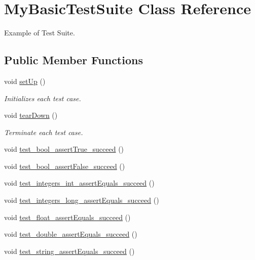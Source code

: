 \hypertarget{class_my_basic_test_suite}{}\section{My\+Basic\+Test\+Suite Class Reference}
\label{class_my_basic_test_suite}


Example of Test Suite.  


\subsection*{Public Member Functions}
\begin{DoxyCompactItemize}
\item 
void \mbox{\hyperlink{class_my_basic_test_suite_a78580af3199c6d14278446ba5c67b741}{set\+Up}} ()
\begin{DoxyCompactList}\small\item\em Initializes each test case. \end{DoxyCompactList}\item 
void \mbox{\hyperlink{class_my_basic_test_suite_a83b6bce47ffac97d43b8e2d14cbd48aa}{tear\+Down}} ()
\begin{DoxyCompactList}\small\item\em Terminate each test case. \end{DoxyCompactList}\item 
void \mbox{\hyperlink{class_my_basic_test_suite_a0f9bf87994d157ca17f8cf2d8d8d31b7}{test\+\_\+bool\+\_\+assert\+True\+\_\+succeed}} ()
\item 
void \mbox{\hyperlink{class_my_basic_test_suite_ae8f4c3d56e31655ae5f887c4f73b34e6}{test\+\_\+bool\+\_\+assert\+False\+\_\+succeed}} ()
\item 
void \mbox{\hyperlink{class_my_basic_test_suite_a78e65fb1514fc53943a942d99222ef26}{test\+\_\+integers\+\_\+int\+\_\+assert\+Equals\+\_\+succeed}} ()
\item 
void \mbox{\hyperlink{class_my_basic_test_suite_af6dbaa47377dfe79f4c00a20789757ed}{test\+\_\+integers\+\_\+long\+\_\+assert\+Equals\+\_\+succeed}} ()
\item 
void \mbox{\hyperlink{class_my_basic_test_suite_ab56d6a5bc0e0ccb511798df750acb4a1}{test\+\_\+float\+\_\+assert\+Equals\+\_\+succeed}} ()
\item 
void \mbox{\hyperlink{class_my_basic_test_suite_a4e1eb8aaa161bb78d81f87ced7a34622}{test\+\_\+double\+\_\+assert\+Equals\+\_\+succeed}} ()
\item 
void \mbox{\hyperlink{class_my_basic_test_suite_ac6cfe0dda4c123f996129b55fd703865}{test\+\_\+string\+\_\+assert\+Equals\+\_\+succeed}} ()
\end{DoxyCompactItemize}


